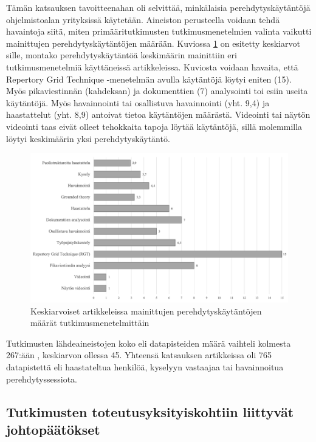 \documentclass[utf8]{gradu3}
\begin{document}
Tämän katsauksen tavoitteenahan oli selvittää, minkälaisia perehdytyskäytäntöjä ohjelmistoalan yrityksissä käytetään. Aineiston perusteella voidaan tehdä havaintoja siitä, miten primääritutkimusten tutkimusmenetelmien valinta vaikutti mainittujen perehdytyskäytäntöjen määrään. Kuviossa \ref{kuvio:menetelmilla-havaitut-kaytannot} on esitetty keskiarvot sille, montako perehdytyskäytäntöä keskimäärin mainittiin eri tutkimusmenetelmiä käyttäneissä artikkeleissa. Kuviosta voidaan havaita, että Repertory Grid Technique -menetelmän avulla käytäntöjä löytyi eniten (15). Myös pikaviestinnän (kahdeksan) ja dokumenttien (7) analysointi toi esiin useita käytäntöjä. Myös havainnointi tai osallistuva havainnointi (yht. 9,4) ja haastattelut (yht. 8,9) antoivat tietoa käytäntöjen määrästä. Videointi tai näytön videointi taas eivät olleet tehokkaita tapoja löytää käytäntöjä, sillä molemmilla löytyi keskimäärin yksi perehdytyskäytäntö.

\begin{figure}[h]
    \centering
    \includegraphics[width=\textwidth]{media/menetelmilla-havaitut-kaytannot.png}
    \caption{Keskiarvoiset artikkeleissa mainittujen perehdytyskäytäntöjen määrät tutkimusmenetelmittäin}
    \label{kuvio:menetelmilla-havaitut-kaytannot}
\end{figure}

Tutkimusten lähdeaineistojen koko eli datapisteiden määrä vaihteli kolmesta \textcite{kulkarni-ym-2010} 267:ään \textcite{rodeghero-ym-2021}, keskiarvon ollessa 45. Yhteensä katsauksen artikkeissa oli 765 datapistettä eli haastateltua henkilöä, kyselyyn vastaajaa tai havainnoitua perehdytyssessiota.

\subsection{Tutkimusten toteutusyksityiskohtiin liittyvät johtopäätökset}
\end{document}
